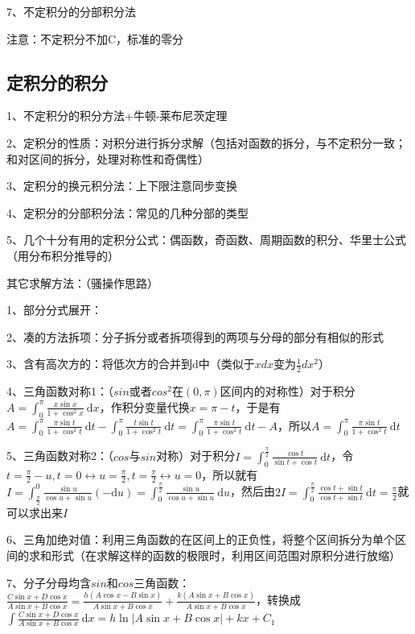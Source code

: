 7、不定积分的分部积分法

注意：不定积分不加C，标准的零分



\subsection{定积分的积分}

1、不定积分的积分方法+牛顿-莱布尼茨定理

2、定积分的性质：对积分进行拆分求解（包括对函数的拆分，与不定积分一致；和对区间的拆分，处理对称性和奇偶性）

3、定积分的换元积分法：上下限注意同步变换

4、定积分的分部积分法：常见的几种分部的类型

5、几个十分有用的定积分公式：偶函数，奇函数、周期函数的积分、华里士公式（用分布积分推导的）

其它求解方法：（骚操作思路）

1、部分分式展开：

2、凑的方法拆项：分子拆分或者拆项得到的两项与分母的部分有相似的形式

3、含有高次方的：将低次方的合并到d中（类似于$ xdx $变为$ \frac{1}{2}dx^2 $）

4、三角函数对称1：（$ sin $或者$ cos^2 $在$ (0,\pi) $区间内的对称性）对于积分$ A=\int_{0}^{\pi} \frac{x \sin x}{1+\cos ^{2} x} \mathrm{~d} x $，作积分变量代换$ x=\pi-t $，于是有$ A=\int_{0}^{\pi} \frac{\pi \sin t}{1+\cos ^{2} t} \mathrm{~d} t-\int_{0}^{\pi} \frac{t \sin t}{1+\cos ^{2} t} \mathrm{~d} t=\int_{0}^{\pi} \frac{\pi \sin t}{1+\cos ^{2} t} \mathrm{~d} t-A $，所以$ A=\int_{0}^{\pi} \frac{\pi \sin t}{1+\cos ^{2} t} \mathrm{~d} t $

5、三角函数对称2：（$ cos $与$ sin $对称）对于积分$ I=\int_{0}^{\frac{\pi}{2}} \frac{\cos t}{\sin t+\cos t} \mathrm{~d} t $，令$ t=\frac{\pi}{2}-u, t=0 \leftrightarrow u=\frac{\pi}{2}, t=\frac{\pi}{2} \leftrightarrow u=0 $，所以就有$ I=\int_{\frac{\pi}{2}}^{0} \frac{\sin u}{\cos u+\sin u}(-\mathrm{d} u)=\int_{0}^{\frac{\pi}{2}} \frac{\sin u}{\cos u+\sin u} \mathrm{~d} u $，然后由$ 2 I=\int_{0}^{\frac{\pi}{2}} \frac{\cos t+\sin t}{\cos t+\sin t} \mathrm{~d} t=\frac{\pi}{2} $就可以求出来$ I $

6、三角加绝对值：利用三角函数的在区间上的正负性，将整个区间拆分为单个区间的求和形式（在求解这样的函数的极限时，利用区间范围对原积分进行放缩）

7、分子分母均含$ sin $和$ cos $三角函数：$ \frac{C \sin x+D \cos x}{A \sin x+B \cos x}=\frac{h(A \cos x-B \sin x)}{A \sin x+B \cos x}+\frac{k(A \sin x+B \cos x)}{A \sin x+B \cos x} $，转换成$ \int \frac{C \sin x+D \cos x}{A \sin x+B \cos x} \mathrm{~d} x=h \ln |A \sin x+B \cos x|+k x+C_{1} $


